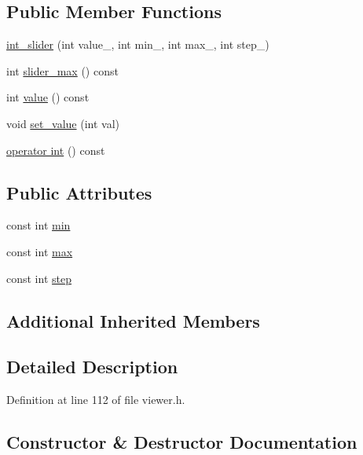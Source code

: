 \subsection*{Public Member Functions}
\begin{DoxyCompactItemize}
\item 
\hyperlink{classtlz_1_1viewer_1_1int__slider_ad1497e100dc165fa706639512c05afba}{int\+\_\+slider} (int value\+\_\+, int min\+\_\+, int max\+\_\+, int step\+\_\+)
\item 
int \hyperlink{classtlz_1_1viewer_1_1int__slider_aa83017e92626fb2405cc233da9810a67}{slider\+\_\+max} () const 
\item 
int \hyperlink{classtlz_1_1viewer_1_1int__slider_a8061927d88349d36d8d1d712c4553d86}{value} () const 
\item 
void \hyperlink{classtlz_1_1viewer_1_1int__slider_a83e0e27af5ea2d2b742e4152eb7c00d6}{set\+\_\+value} (int val)
\item 
\hyperlink{classtlz_1_1viewer_1_1int__slider_a948cb15a2780b0901519ca3701249b7e}{operator int} () const 
\end{DoxyCompactItemize}
\subsection*{Public Attributes}
\begin{DoxyCompactItemize}
\item 
const int \hyperlink{classtlz_1_1viewer_1_1int__slider_a019f877e645a365caec6173a4a2b3d70}{min}
\item 
const int \hyperlink{classtlz_1_1viewer_1_1int__slider_ab82968e1d45f6237d24ace1eafdc7cd3}{max}
\item 
const int \hyperlink{classtlz_1_1viewer_1_1int__slider_a8675e4655f77bccba958eb2af5892ce0}{step}
\end{DoxyCompactItemize}
\subsection*{Additional Inherited Members}


\subsection{Detailed Description}


Definition at line 112 of file viewer.\+h.



\subsection{Constructor \& Destructor Documentation}
